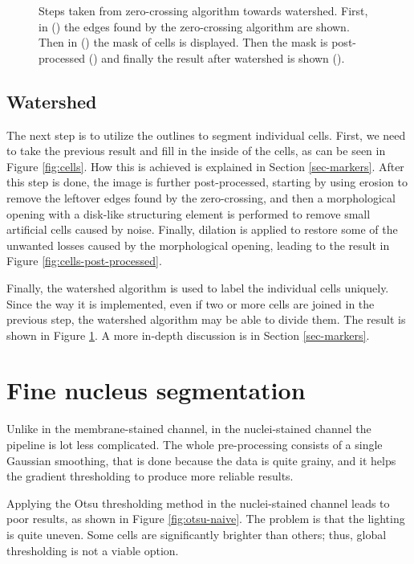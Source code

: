 \documentclass[
  digital,     %
  oneside,     %
  nosansbold,  %
  nocolorbold, %
  lof,         %
  lot,         %
]{fithesis4}
\begin{document}
\begin{figure}
\begin{subfigure}[t]{0.45\textwidth}
        \caption{}
        \label{fig:watershed}
    \end{subfigure}
    \caption{Steps taken from zero-crossing algorithm towards watershed. First, in () the edges found by the zero-crossing algorithm are shown. Then in () the mask of cells is displayed. Then the mask is post-processed () and finally the result after watershed is shown ().}
    \label{fig:zc-watershed}
\end{figure}

\subsection{Watershed}
The next step is to utilize the outlines to segment individual cells. First, we need
to take the previous result and fill in the inside of the cells, as can be seen
in Figure \ref{fig:cells}. How this is achieved is explained in Section
\ref{sec-markers}. After this step is done, the image is further post-processed,
starting by using erosion to remove the leftover edges found by the zero-crossing, and then a morphological opening with
a disk-like structuring element is performed to remove small artificial cells caused
by noise. Finally, dilation is applied to restore some of the unwanted losses
caused by the morphological opening, leading to the result in Figure 
\ref{fig:cells-post-processed}.

Finally, the watershed algorithm is used to label the individual cells uniquely.
Since the way it is implemented, even if two or more cells are joined in the
previous step, the watershed algorithm may be able to divide them. The result
is shown in Figure \ref{fig:watershed}. A more in-depth discussion is in Section
\ref{sec-markers}.

\section{Fine nucleus segmentation}
Unlike in the membrane-stained channel, in the nuclei-stained channel the
pipeline is lot less complicated. The whole pre-processing consists of a single
Gaussian smoothing, that is done because the data is quite grainy, and it helps
the gradient thresholding to produce more reliable results.

Applying the Otsu thresholding method in the nuclei-stained channel leads to
poor results, as shown in Figure \ref{fig:otsu-naive}. The problem is that the
lighting is quite uneven. Some cells are significantly brighter than others;
thus, global thresholding is not a viable option.
\end{document}
